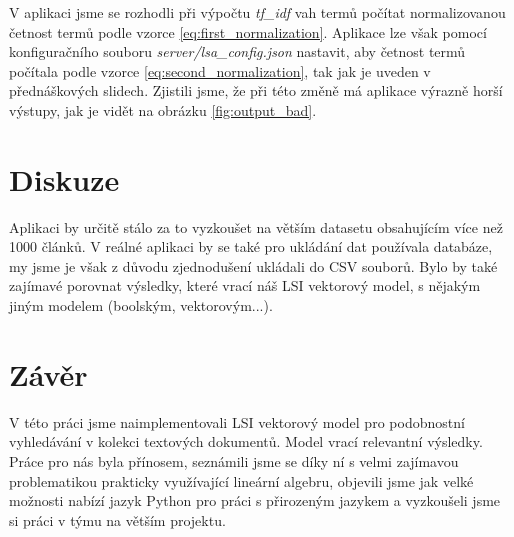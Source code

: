 \documentclass[11pt]{scrartcl} %
\begin{document}
V aplikaci jsme se rozhodli při výpočtu \emph{tf\_idf} vah termů počítat normalizovanou četnost termů podle vzorce \ref{eq:first_normalization}. Aplikace lze však pomocí konfiguračního souboru \emph{server/lsa\_config.json} nastavit, aby četnost termů počítala podle vzorce \ref{eq:second_normalization}, tak jak je uveden v přednáškových slidech. Zjistili jsme, že při této změně má aplikace výrazně horší výstupy, jak je vidět na obrázku \ref{fig:output_bad}.

\section{Diskuze}

Aplikaci by určitě stálo za to vyzkoušet na větším datasetu obsahujícím více než 1000 článků. V reálné aplikaci by se také pro ukládání dat používala databáze, my jsme je však z důvodu zjednodušení ukládali do CSV souborů. Bylo by také zajímavé porovnat výsledky, které vrací náš LSI vektorový model, s nějakým jiným modelem (boolským, vektorovým...).

\section{Závěr}

V této práci jsme naimplementovali LSI vektorový model pro podobnostní vyhledávání v kolekci textových dokumentů. Model vrací relevantní výsledky. Práce pro nás byla přínosem, seznámili jsme se díky ní s velmi zajímavou problematikou prakticky využívající lineární algebru, objevili jsme jak velké možnosti nabízí jazyk Python pro práci s přirozeným jazykem a vyzkoušeli jsme si práci v týmu na větším projektu.
\end{document}
